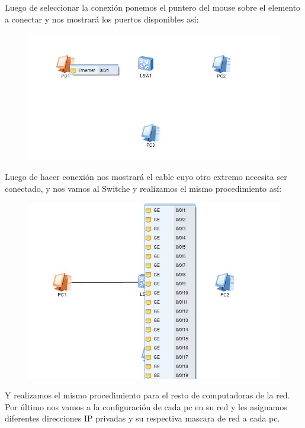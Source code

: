 \documentclass[journal]{IEEEtran}
\begin{document}
Luego de seleccionar la conexión ponemos el puntero del mouse sobre el elemento a conectar y nos mostrará los puertos disponibles así:
\begin{center}
\begin{figure}[H]
\centering
\includegraphics[scale=0.65]{6.JPG} 
\end{figure}
\end{center}
Luego de hacer conexión nos mostrará el cable cuyo otro extremo necesita ser conectado, y nos vamos al Switche y realizamos el mismo procedimiento así:
\begin{center}
\begin{figure}[H]
\centering
\includegraphics[scale=0.55]{7.JPG} 
\end{figure}
\end{center}
Y realizamos el mismo procedimiento para el resto de computadoras de la red.
Por último nos vamos a la configuración de cada pc en su red y les asignamos diferentes direcciones IP privadas y su respectiva  mascara de red a cada pc.\\
 
\end{document}
